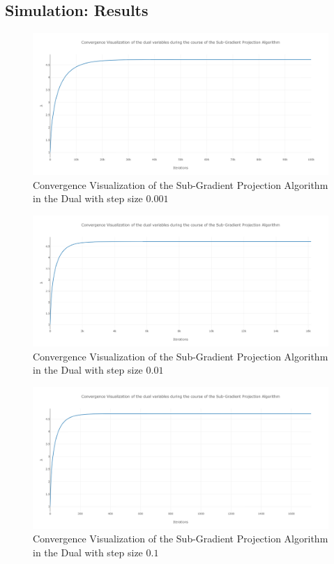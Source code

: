 \documentclass[12pt, draftcls, onecolumn]{IEEEtran}
\begin{document}
\subsection{Simulation: Results}
\begin{figure}[t]
\includegraphics[width=1.0\textwidth]{Convergence_Plot_Step_Size_point001.png}
\caption{Convergence Visualization of the Sub-Gradient Projection Algorithm in the Dual with step size $0.001$}
\label{fig:mesh8}
\centering
\end{figure}
\begin{figure}[t]
\includegraphics[width=1.0\textwidth]{Convergence_Plot_Step_Size_point01.png}
\caption{Convergence Visualization of the Sub-Gradient Projection Algorithm in the Dual with step size $0.01$}
\label{fig:mesh9}
\centering
\end{figure}
\begin{figure}[t]
\includegraphics[width=1.0\textwidth]{Convergence_Plot_Step_Size_point1.png}
\caption{Convergence Visualization of the Sub-Gradient Projection Algorithm in the Dual with step size $0.1$}
\label{fig:mesh10}
\centering
\end{figure}
\end{document}
